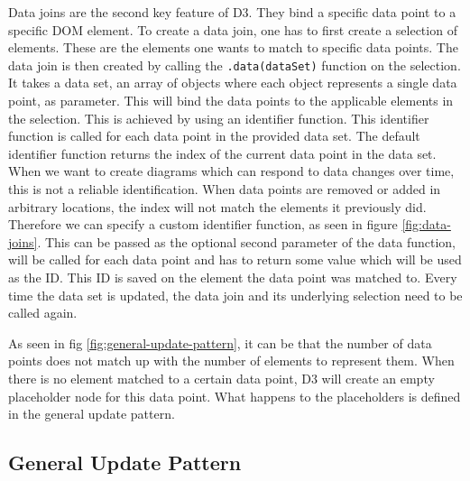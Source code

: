 Data joins are the second key feature of D3. They bind a specific data point to a specific DOM element. To create a data join, one has to first create a selection of elements. These are the elements one wants to match to specific data points. The data join is then created by calling the \texttt{.data(dataSet)} function on the selection. It takes a data set, an array of objects where each object represents a single data point, as parameter. This will bind the data points to the applicable elements in the selection. This is achieved by using an identifier function. This identifier function is called for each data point in the provided data set. The default identifier function returns the index of the current data point in the data set. When we want to create diagrams which can respond to data changes over time, this is not a reliable identification. When data points are removed or added in arbitrary locations, the index will not match the elements it previously did. Therefore we can specify a custom identifier function, as seen in figure \ref{fig:data-joins}. This can be passed as the optional second parameter of the data function, will be called for each data point and has to return some value which will be used as the ID. This ID is saved on the element the data point was matched to. Every time the data set is updated, the data join and its underlying selection need to be called again.

As seen in fig \ref{fig:general-update-pattern}, it can be that the number of data points does not match up with the number of elements to represent them. When there is no element matched to a certain data point, D3 will create an empty placeholder node for this data point. What happens to the placeholders is defined in the general update pattern.


\subsection{General Update Pattern}



